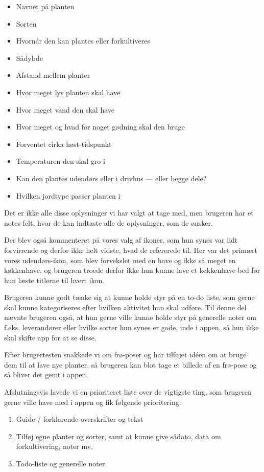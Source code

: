 \begin{itemize}
    \item Navnet på planten
    \item Sorten
    \item Hvornår den kan plantes eller forkultiveres
    \item Sådybde
    \item Afstand mellem planter
    \item Hvor meget lys planten skal have
    \item Hvor meget vand den skal have
    \item Hvor meget og hvad for noget gødning skal den bruge
    \item Forventet cirka høst-tidspunkt
    \item Temperaturen den skal gro i
    \item Kan den plantes udendørs eller i drivhus --- eller begge dele?
    \item Hvilken jordtype passer planten i
\end{itemize}

Det er ikke alle disse oplysninger vi har valgt at tage med, men brugeren har et notes-felt, hvor de kan indtaste alle de oplysninger, som de ønsker.

Der blev også kommenteret på vores valg af ikoner, som hun synes var lidt forvirrende og derfor ikke helt vidste, hvad de refererede til. Her var det primært vores udendørs-ikon, som blev forvekslet med en have og ikke så meget en køkkenhave, og brugeren troede derfor ikke hun kunne lave et køkkenhave-bed før hun læste titlerne til hvert ikon.

Brugeren kunne godt tænke sig at kunne holde styr på en to-do liste, som gerne skal kunne kategoriseres efter hvilken aktivitet hun skal udføre. Til denne del nævnte brugeren også, at hun gerne ville kunne holde styr på generelle noter om f.eks. leverandører eller hvilke sorter hun synes er gode, inde i appen, så hun ikke skal skifte app for at se disse.

Efter brugertesten snakkede vi om frø-poser og har tilføjet idéen om at bruge dem til at lave nye planter, så brugeren kan blot tage et billede af en frø-pose og så bliver det gemt i appen.

Afslutningsvis lavede vi en prioriteret liste over de vigtigste ting, som brugeren gerne ville have med i appen og fik følgende prioritering:

\begin{enumerate}
    \item Guide / forklarende overskrifter og tekst
    \item Tilføj egne planter og sorter, samt at kunne give sådato, data om forkultivering, noter mv.
    \item Todo-liste og generelle noter
\end{enumerate}

